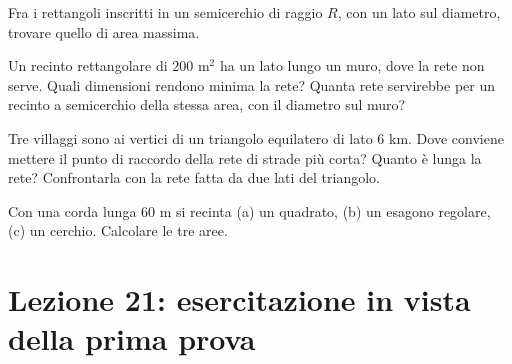\begin{esercizio}[\liv{2}]
Fra i rettangoli inscritti in un semicerchio di raggio $R$, con un lato sul diametro, trovare quello di area massima.
\end{esercizio}

\begin{esercizio}[\liv{2}]
Un recinto rettangolare di $200$ m$^2$ ha un lato lungo un muro, dove la rete non serve. Quali dimensioni rendono minima la rete? Quanta rete servirebbe per un recinto a semicerchio della stessa area, con il diametro sul muro?
\end{esercizio}

\begin{esercizio}[\liv{3}]
Tre villaggi sono ai vertici di un triangolo equilatero di lato $6$ km. Dove conviene mettere il punto di raccordo della rete di strade più corta? Quanto è lunga la rete? Confrontarla con la rete fatta da due lati del triangolo.
\end{esercizio}

\begin{esercizio}[\liv{1}]
Con una corda lunga $60$ m si recinta (a) un quadrato, (b) un esagono regolare, (c) un cerchio. Calcolare le tre aree.
\end{esercizio}

\section{Lezione 21: esercitazione in vista della prima prova}

